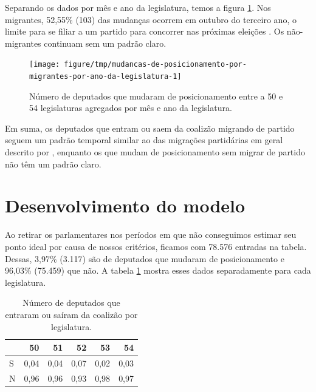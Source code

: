\documentclass[a4paper,titlepage]{ppgi}\usepackage[]{graphicx}\usepackage[]{color}
\newenvironment{knitrout}{}{} %
\begin{document}
Separando os dados por mês e ano da legislatura, temos a figura
\ref{fig:mudancas-de-posicionamento-por-migrantes-por-ano-da-legislatura}. Nos
migrantes,
52,55\%
(103) das mudanças ocorrem
em outubro do terceiro ano, o limite para se filiar a um partido para concorrer
nas próximas eleições \cite{Lei9504/1997}. Os não-migrantes continuam sem um
padrão claro.

\begin{knitrout}
\color{fgcolor}\begin{figure}
\texttt{[image: figure/tmp/mudancas-de-posicionamento-por-migrantes-por-ano-da-legislatura-1]} \caption[Número de deputados que mudaram de posicionamento entre a 50\textordfeminine{} e 54\textordfeminine{} legislaturas agregados por mês e ano da legislatura]{Número de deputados que mudaram de posicionamento entre a 50\textordfeminine{} e 54\textordfeminine{} legislaturas agregados por mês e ano da legislatura.}\label{fig:mudancas-de-posicionamento-por-migrantes-por-ano-da-legislatura}
\end{figure}


\end{knitrout}

Em suma, os deputados que entram ou saem da coalizão migrando de partido
seguem um padrão temporal similar ao das migrações partidárias em geral
descrito por , enquanto os que mudam de posicionamento
sem migrar de partido não têm um padrão claro.

\section{Desenvolvimento do modelo}



Ao retirar os parlamentares nos períodos em que não conseguimos estimar seu
ponto ideal por causa de nossos critérios, ficamos com 78.576
entradas na tabela. Dessas, 3,97\%
(3.117) são de deputados que mudaram
de posicionamento e 96,03\%
(75.459) que não. A tabela
\ref{table:changed-coalitions-per-legislature} mostra esses dados separadamente
para cada legislatura.

\begin{table}
\centering
\begin{knitrout}
\color{fgcolor}
\begin{tabular}{l|r|r|r|r|r}
\hline
  & 50 & 51 & 52 & 53 & 54\\
\hline
S & 0,04 & 0,04 & 0,07 & 0,02 & 0,03\\
\hline
N & 0,96 & 0,96 & 0,93 & 0,98 & 0,97\\
\hline
\end{tabular}


\end{knitrout}
\caption{Número de deputados que entraram ou saíram da coalizão por legislatura.}
\label{table:changed-coalitions-per-legislature}
\end{table}
\end{document}
